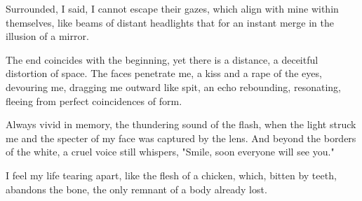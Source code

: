 {Surrounded, I said,
I cannot escape their gazes,
which align with mine within themselves,
like beams of distant headlights
that for an instant merge
in the illusion of a mirror.

The end coincides with the beginning, yet there is a distance,
a deceitful distortion of space.
The faces penetrate me,
a kiss and a rape of the eyes,
devouring me, dragging me outward like spit,
an echo rebounding, resonating,
fleeing from perfect coincidences of form.

Always vivid in memory,
the thundering sound of the flash, when the light struck me
and the specter of my face was captured by the lens.
And beyond the borders of the white,
a cruel voice still whispers,
"Smile, soon everyone will see you."

I feel my life tearing apart,
like the flesh of a chicken,
which, bitten by teeth, abandons the bone,
the only remnant of a body already lost.}

